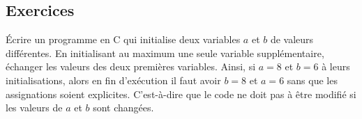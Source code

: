 \documentclass[../../../main.tex]{subfiles}
\begin{document}
\subsection{Exercices}
 Écrire un programme en C qui initialise deux variables $a$ et $b$ de valeurs différentes. En initialisant au maximum une seule variable supplémentaire, échanger les valeurs des deux premières variables. Ainsi, si $a = 8$ et $b = 6$ à leurs initialisations, alors en fin d'exécution il faut avoir $b = 8$ et $a = 6$ sans que les assignations soient explicites. C'est-à-dire que le code ne doit pas à être modifié si les valeurs de $a$ et $b$ sont changées.
\end{document}
